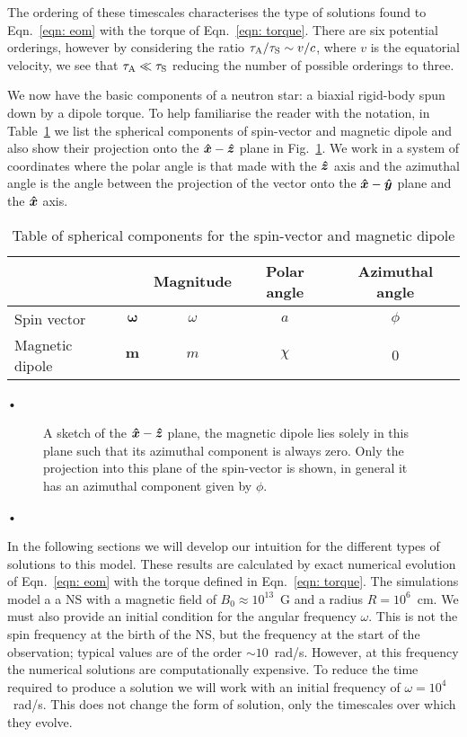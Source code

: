 \documentclass[../full_thesis/full_thesis.tex]{subfiles}
\newcommand{\thisdir}{../rotating_frame}
\begin{document}
The ordering of these timescales characterises the type of solutions found to
Eqn.~\eqref{eqn: eom} with the torque of Eqn.~\eqref{eqn: torque}. There are
six potential orderings, however by considering the ratio $\tau_{\mathrm{A}}/\tau_{\mathrm{S}}
\sim v/c$, where $v$ is the equatorial velocity, we see that $\tau_{\mathrm{A}} \ll
\tau_{\mathrm{S}}$ reducing the number of possible orderings to three.

We now have the basic components of a neutron star: a biaxial rigid-body spun
down by a dipole torque. To help familiarise the reader with the notation, in
Table~\ref{tab: definitions} we list the spherical components of spin-vector
and magnetic dipole and also show their projection onto the $\boldsymbol{\hat{x}}-\boldsymbol{\hat{z}}$ plane in
Fig.~\ref{fig: sketch01}. We work in a system of coordinates where the polar
angle is that made with the $\boldsymbol{\hat{z}}$ axis and the azimuthal angle is the angle between
the projection of the vector onto the $\boldsymbol{\hat{x}}-\boldsymbol{\hat{y}}$ plane and the $\boldsymbol{\hat{x}}$ axis.
\begin{table}[ht]
\centering
\begin{tabular}{|l|c|c|c|c|} \hline
 \multicolumn{2}{|c|}{} & Magnitude & Polar angle & Azimuthal angle \\ \hline
Spin vector  & $\boldsymbol{\omega}$ & $\omega$ & $a$ & $\phi$ \\ \hline
Magnetic dipole &  $\boldsymbol{m}$ & $m$ & $\chi$ & 0 \\ \hline
\end{tabular}•
\caption{Table of spherical components for the spin-vector and magnetic dipole}
\label{tab: definitions}
\end{table}

\begin{figure}[ht]
\centering

\caption{A sketch of the  $\boldsymbol{\hat{x}}-\boldsymbol{\hat{z}}$ plane,  the magnetic dipole lies solely in
this plane such that its azimuthal component is always zero.  Only the
projection into this plane of the spin-vector is shown, in general it has an
azimuthal component given by $\phi$.}
	\label{fig: sketch01}
\end{figure}•

In the following sections we will develop our intuition for the different types
of solutions to this model. These results are calculated by 
exact numerical evolution of Eqn.~\eqref{eqn: eom} with the torque defined in
Eqn.~\eqref{eqn: torque}. The simulations model a a NS with a magnetic field of
$B_{0}\approx10^{13}$~G and a radius $R=10^{6}$~cm. We must also provide an
initial condition for the angular frequency $\omega$. This is not the spin
frequency at the birth of the NS, but the frequency at the start of the observation;
typical values are of the order $\sim 10$~rad/s. However, at this frequency the
numerical solutions are computationally expensive. To reduce the time required
to produce a solution we will work with an initial frequency of $\omega =
10^{4}$~rad/s. This does not change the form of solution, only the timescales
over which they evolve.
\end{document}
